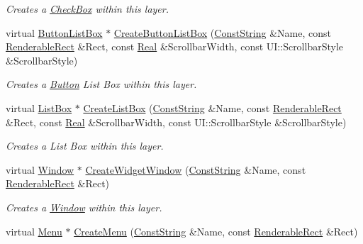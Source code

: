 \begin{DoxyCompactItemize}
\begin{DoxyCompactList}\small\item\em Creates a \hyperlink{classphys_1_1UI_1_1CheckBox}{CheckBox} within this layer. \item\end{DoxyCompactList}\item 
virtual \hyperlink{classphys_1_1UI_1_1ButtonListBox}{ButtonListBox} $\ast$ \hyperlink{classphys_1_1UI_1_1Layer_a27df96a5487380afae0b665242da061a}{CreateButtonListBox} (\hyperlink{namespacephys_a5ce5049f8b4bf88d6413c47b504ebb31}{ConstString} \&Name, const \hyperlink{structphys_1_1UI_1_1RenderableRect}{RenderableRect} \&Rect, const \hyperlink{namespacephys_af7eb897198d265b8e868f45240230d5f}{Real} \&ScrollbarWidth, const UI::ScrollbarStyle \&ScrollbarStyle)
\begin{DoxyCompactList}\small\item\em Creates a \hyperlink{classphys_1_1UI_1_1Button}{Button} List Box within this layer. \item\end{DoxyCompactList}\item 
virtual \hyperlink{classphys_1_1UI_1_1ListBox}{ListBox} $\ast$ \hyperlink{classphys_1_1UI_1_1Layer_a9bb957261e17e11ed7a320d8ba10f9c6}{CreateListBox} (\hyperlink{namespacephys_a5ce5049f8b4bf88d6413c47b504ebb31}{ConstString} \&Name, const \hyperlink{structphys_1_1UI_1_1RenderableRect}{RenderableRect} \&Rect, const \hyperlink{namespacephys_af7eb897198d265b8e868f45240230d5f}{Real} \&ScrollbarWidth, const UI::ScrollbarStyle \&ScrollbarStyle)
\begin{DoxyCompactList}\small\item\em Creates a List Box within this layer. \item\end{DoxyCompactList}\item 
virtual \hyperlink{classphys_1_1UI_1_1Window}{Window} $\ast$ \hyperlink{classphys_1_1UI_1_1Layer_a2efe08dca3cb4300a68c7f4d8e5296a0}{CreateWidgetWindow} (\hyperlink{namespacephys_a5ce5049f8b4bf88d6413c47b504ebb31}{ConstString} \&Name, const \hyperlink{structphys_1_1UI_1_1RenderableRect}{RenderableRect} \&Rect)
\begin{DoxyCompactList}\small\item\em Creates a \hyperlink{classphys_1_1UI_1_1Window}{Window} within this layer. \item\end{DoxyCompactList}\item 
virtual \hyperlink{classphys_1_1UI_1_1Menu}{Menu} $\ast$ \hyperlink{classphys_1_1UI_1_1Layer_afe5b5ed6409890ba6d9511e3246e69a9}{CreateMenu} (\hyperlink{namespacephys_a5ce5049f8b4bf88d6413c47b504ebb31}{ConstString} \&Name, const \hyperlink{structphys_1_1UI_1_1RenderableRect}{RenderableRect} \&Rect)

\end{DoxyCompactItemize}

